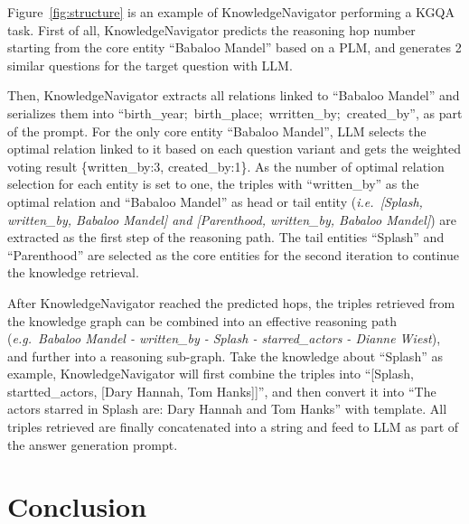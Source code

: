 \documentclass{article}
\begin{document}
Figure~\ref{fig:structure} is an example of KnowledgeNavigator performing a KGQA task. First of all, KnowledgeNavigator predicts the reasoning hop number starting from the core entity \enquote{Babaloo Mandel} based on a PLM, and generates 2 similar questions for the target question with LLM. 

Then, KnowledgeNavigator extracts all relations linked to \enquote{Babaloo Mandel} and serializes them into \enquote{birth\_year;~birth\_place;~wrritten\_by;~created\_by}, as part of the prompt. For the only core entity \enquote{Babaloo Mandel}, LLM selects the optimal relation linked to it based on each question variant and gets the weighted voting result \{written\_by:3, created\_by:1\}. As the number of optimal relation selection for each entity is set to one, the triples with \enquote{written\_by} as the optimal relation and \enquote{Babaloo Mandel} as head or tail entity (\textit{i.e.~[Splash, written\_by, Babaloo Mandel] and [Parenthood, written\_by, Babaloo Mandel]}) are extracted as the first step of the reasoning path. The tail entities \enquote{Splash} and \enquote{Parenthood} are selected as the core entities for the second iteration to continue the knowledge retrieval.

After KnowledgeNavigator reached the predicted hops, the triples retrieved from the knowledge graph can be combined into an effective reasoning path (\textit{e.g.~Babaloo Mandel - written\_by - Splash - starred\_actors - Dianne Wiest}), and further into a reasoning sub-graph. Take the knowledge about \enquote{Splash} as example, KnowledgeNavigator will first combine the triples into \enquote{[Splash, startted\_actors, [Dary Hannah, Tom Hanks]]}, and then convert it into \enquote{The actors starred in Splash are: Dary Hannah and Tom Hanks} with template. All triples retrieved are finally concatenated into a string and feed to LLM as part of the answer generation prompt.


\section{Conclusion}
\end{document}
